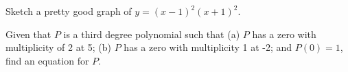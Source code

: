 \documentclass[12pt,fleqn]{exam}
\begin{document}
\begin{questions}

\vfill
\newpage

\question Sketch a pretty good graph of $y = (x-1)^2 (x+1)^2$.
\begin{solution}[3.25in]
    
\end{solution}

\question [1]  Given that $P$ is a third degree polynomial such that
(a) $P$ has a zero with multiplicity of 2 at 5; (b) $P$ has a zero with multiplicity 1 
at -2; and $P(0) = 1$, find an equation for $P$.
\end{questions}
\end{document}

